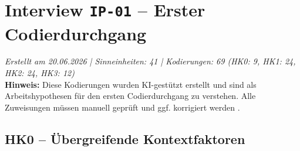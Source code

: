 
\section*{Interview \texttt{IP-01} -- Erster Codierdurchgang}

\noindent\textit{Erstellt am 20.06.2026 | Sinneinheiten: 41 |
Kodierungen: 69 (HK0: 9, HK1: 24,
HK2: 24, HK3: 12)}\\[0.5em]

\noindent\textbf{Hinweis:} Diese Kodierungen wurden KI-gest\"utzt erstellt und
sind als Arbeitshypothesen f\"ur den ersten Codierdurchgang zu verstehen.
Alle Zuweisungen m\"ussen manuell gepr\"uft und ggf. korrigiert werden
\parencite{kuckartzQualitativeInhaltsanalyseMethoden2018}.

\subsection*{HK0 -- Übergreifende Kontextfaktoren}

